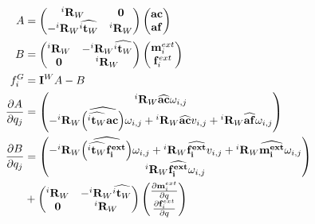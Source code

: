 \begin{align}
  A &=
  \begin{pmatrix}
    {{}^i\mathbf{R}_W} & \mathbf{0} \\
    -{{}^i\mathbf{R}_W}\widehat{{}^i\mathbf{t}_W} & {{}^i\mathbf{R}_W} \\
  \end{pmatrix}
  \begin{pmatrix}
    \mathbf{ac} \\ \mathbf{af}
  \end{pmatrix} \\
  B &=
  \begin{pmatrix}
    {{}^i\mathbf{R}_W} & -{{}^i\mathbf{R}_W}\widehat{{}^i\mathbf{t}_W} \\
    \mathbf{0} & {{}^i\mathbf{R}_W} \\
  \end{pmatrix}
  \begin{pmatrix}
    \mathbf{m}^{ext}_i \\ \mathbf{f}^{ext}_i
  \end{pmatrix} \\
  f^G_i &= \mathbf{I}^WA-B\\
  \frac{\partial A}{\partial q_j} &=
  \begin{pmatrix}
    {}^i\mathbf{R}_W \widehat{\bf ac} \omega_{i,j}\\
    -{{}^i\mathbf{R}_W}\widehat{\left(\widehat{{}^i\mathbf{t}_W}\bf ac \right)}\omega_{i,j}
    + {{}^i\mathbf{R}_W}\widehat{\bf ac} v_{i,j} + {}^i\mathbf{R}_W \widehat{\bf af} \omega_{i,j}\\
  \end{pmatrix}
  \\
  \frac{\partial B}{\partial q_j} &=
  \begin{pmatrix}
    - {{}^i\mathbf{R}_W}\widehat{\left(\widehat{{}^i\mathbf{t}_W}\bf \mathbf{f}^{ext}_i \right)}\omega_{i,j}
    + {{}^i\mathbf{R}_W}\widehat{\bf \mathbf{f}^{ext}_i} v_{i,j} + {}^i\mathbf{R}_W \widehat{\bf \mathbf{m}^{ext}_i} \omega_{i,j}\\
    {}^i\mathbf{R}_W \widehat{\bf \mathbf{f}^{ext}_i} \omega_{i,j}\\
  \end{pmatrix}
  \\&+
  \begin{pmatrix}
    {{}^i\mathbf{R}_W} & -{{}^i\mathbf{R}_W}\widehat{{}^i\mathbf{t}_W} \\
    \mathbf{0} & {{}^i\mathbf{R}_W} \\
  \end{pmatrix}
  \begin{pmatrix}
    \frac{\partial \mathbf{m}^{ext}_i}{\partial q} \\ \frac{\partial \mathbf{f}^{ext}_i}{\partial q}
  \end{pmatrix}
\end{align}

